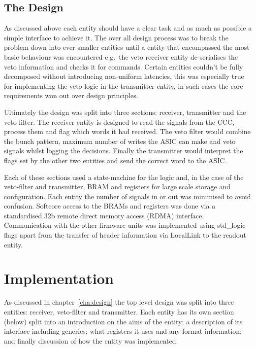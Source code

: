 \section{The Design} %
\label{sec:the_design}
As discussed above each entity should have a clear task and as much as possible a simple interface to achieve it. The over all design process was to break the problem down into ever smaller entities until a entity that encompassed the most basic behaviour was encountered e.g.\ the veto receiver entity de-serialises the veto information and checks it for commands. Certain entities couldn't be fully decomposed without introducing non-uniform latencies, this was especially true for implementing the veto logic in the transmitter entity, in such cases the core requirements won out over design principles.

Ultimately the design was split into three sections: receiver, transmitter and the veto filter. The receiver entity is designed to read the signals from the CCC, process them and flag which words it had received. The veto filter would combine the bunch pattern, maximum number of writes the ASIC can make and veto signals whilst logging the decisions. Finally the transmitter would interpret the flags set by the other two entities and send the correct word to the ASIC.

Each of these sections used a state-machine for the logic and, in the case of the veto-filter and transmitter, BRAM and registers for large scale storage and configuration. Each entity the number of signals in or out was minimised to avoid confusion. Softcore access to the BRAMs and registers was done via a standardised 32b remote direct memory access (RDMA) interface. Communication with the other firmware units was implemented using std\_logic flags apart from the transfer of header information via LocalLink to the readout entity.
\chapter{Implementation} %
\label{cha:implementation}
As discussed in chapter~\ref{cha:design} the top level design was split into three entities: receiver, veto-filter and transmitter. Each entity has its own section (below) split into an introduction on the aims of the entity; a description of its interface including generics; what registers it uses and any format information; and finally discussion of how the entity was implemented. 

